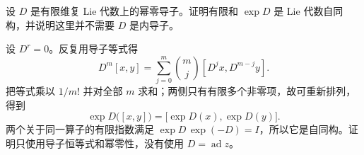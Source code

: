 \begin{optionalexercise}\label{b5:ex:12-exp-nilpotent-derivation}
	设 \(D\) 是有限维复 Lie 代数上的幂零导子。证明有限和 \(\exp D\) 是 Lie 代数自同构，并说明这里并不需要 \(D\) 是内导子。
\end{optionalexercise}
\begin{solution}
	设 \(D^r=0\)。反复用导子等式得
	\[
		D^m[x,y]=\sum_{j=0}^{m}\binom mj[D^jx,D^{m-j}y].
	\]
	把等式乘以 \(1/m!\) 并对全部 \(m\) 求和；两侧只有有限多个非零项，故可重新排列，得到
	\[
		\exp D\bigl([x,y]\bigr)=\bigl[\exp D(x),\exp D(y)\bigr].
	\]
	两个关于同一算子的有限指数满足 \(\exp D\,\exp(-D)=I\)，所以它是自同构。证明只使用导子恒等式和幂零性，没有使用 \(D=\operatorname{ad}z\)。
\end{solution}
